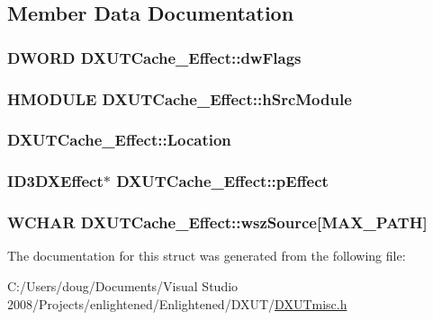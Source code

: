 \subsection{Member Data Documentation}
\hypertarget{struct_d_x_u_t_cache___effect_a4e62f6d5c595fbb5a26dae587ddcfdfb}{
\subsubsection[{dwFlags}]{\setlength{\rightskip}{0pt plus 5cm}DWORD {\bf DXUTCache\_\-Effect::dwFlags}}}
\label{struct_d_x_u_t_cache___effect_a4e62f6d5c595fbb5a26dae587ddcfdfb}
\hypertarget{struct_d_x_u_t_cache___effect_aee7a31cf568cb76010fcaae9b584ec1c}{
\subsubsection[{hSrcModule}]{\setlength{\rightskip}{0pt plus 5cm}HMODULE {\bf DXUTCache\_\-Effect::hSrcModule}}}
\label{struct_d_x_u_t_cache___effect_aee7a31cf568cb76010fcaae9b584ec1c}
\hypertarget{struct_d_x_u_t_cache___effect_aab729cdf923009665f4fcd973f9e27b3}{
\subsubsection[{Location}]{ {\bf DXUTCache\_\-Effect::Location}}}
\label{struct_d_x_u_t_cache___effect_aab729cdf923009665f4fcd973f9e27b3}
\hypertarget{struct_d_x_u_t_cache___effect_a6783ea0da06d165ef3a7de16b0ba3aad}{
\subsubsection[{pEffect}]{\setlength{\rightskip}{0pt plus 5cm}ID3DXEffect$\ast$ {\bf DXUTCache\_\-Effect::pEffect}}}
\label{struct_d_x_u_t_cache___effect_a6783ea0da06d165ef3a7de16b0ba3aad}
\hypertarget{struct_d_x_u_t_cache___effect_a3b8d57991e52fa9ec6f91cf5d94b462c}{
\subsubsection[{wszSource}]{\setlength{\rightskip}{0pt plus 5cm}WCHAR {\bf DXUTCache\_\-Effect::wszSource}\mbox{[}MAX\_\-PATH\mbox{]}}}
\label{struct_d_x_u_t_cache___effect_a3b8d57991e52fa9ec6f91cf5d94b462c}


The documentation for this struct was generated from the following file:\begin{DoxyCompactItemize}
\item 
C:/Users/doug/Documents/Visual Studio 2008/Projects/enlightened/Enlightened/DXUT/\hyperlink{_d_x_u_tmisc_8h}{DXUTmisc.h}\end{DoxyCompactItemize}
